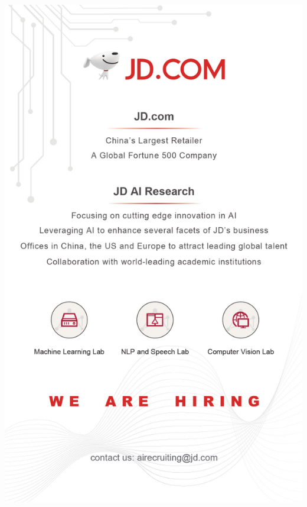 \thispagestyle{empty}
\begin{center}
  \vfill
  \includegraphics[width=\textwidth]{content/ads/full/JD.pdf}
  \vfill
\end{center}

